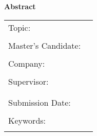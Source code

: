 
\begin{center}
{\Large \textbf{Abstract}}
\end{center}

\bigskip

\begin{center}
	\begin{tabular}{p{4cm}p{9cm}}
		Topic: & \thema \\
		 & \\
		Master's Candidate: & \autor \\
		 & \\
		Company: & \firma \\
		 & \\
		Supervisor: & \prueferA  \\[.5ex]
		 &  \prueferB \\
		 & \\
		Submission Date: & \abgabedatum \\
		 & \\
		Keywords: & \schlagworte \\
		 & \\
	\end{tabular}
\end{center}

\bigskip

\noindent
\zusammenfassung